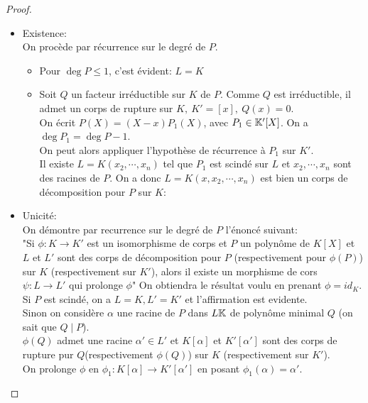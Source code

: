 \begin{proof}
	\begin{itemize}
		\item Existence:\\
		      On procède par récurrence sur le degré de $P$.
		      \begin{itemize}
			      \item Pour $\deg P \leq 1$, c'est évident: $L = K$
			      \item Soit $Q$ un facteur irréductible sur $K$ de $P$.
			            Comme $Q$ est irréductible, il admet un corps de rupture sur $K, \ K' = [x], \ Q(x) = 0$.\\
			            On écrit $P(X) = (X-x)P_1(X)$, avec $P_1 \in \mathbb{K}'[X]$. On a $\deg P_1 = \deg P -1$.\\
			            On peut alors appliquer l'hypothèse de récurrence à $P_1$ sur $K'$.\\
			            Il existe $L = K(x_2, \cdots,  x_n)$ tel que $P_1$ est scindé sur $L$ et
			            $x_2, \cdots, x_n$ sont des racines de $P$. On a donc $L = K(x, x_2, \cdots, x_n)$ est bien un
			            corps de décomposition pour $P$ sur $K$:
		      \end{itemize}
		\item Unicité:\\
		      On démontre par recurrence sur le degré de $P$ l'énoncé suivant:\\
		      "Si $\phi : K \to K'$ est un isomorphisme de corps et $P$ un polynôme de $K[X]$ et $L$ et $L'$
		      sont des corps de décomposition pour $P$ (respectivement pour $\phi(P)$) sur $K$ (respectivement sur $K'$),
		      alors il existe un morphisme de cors $\psi: L \to L'$ qui prolonge $\phi$"
		      On obtiendra le résultat voulu en prenant $\phi = id_K$.\\

		      Si $P$ est scindé, on a $L=K, L'= K'$ et l'affirmation est evidente.\\

		      Sinon on considère $\alpha$ une racine de $P$ dans $L\mathbb{K}$ de polynôme minimal $Q$ (on sait que $Q \mid P$).\\
		      $\phi (Q)$ admet une racine $\alpha' \in L'$ et $K[\alpha]$ et $K'[\alpha']$ sont des corps de rupture pur $Q$(respectivement $\phi(Q)$)
		      sur $K$ (respectivement sur $K'$).\\

		      On prolonge $\phi$ en $\phi_1 : K[\alpha] \to K'[\alpha']$ en posant $\phi_1(\alpha) = \alpha'$.\\


\end{itemize}
\end{proof}
